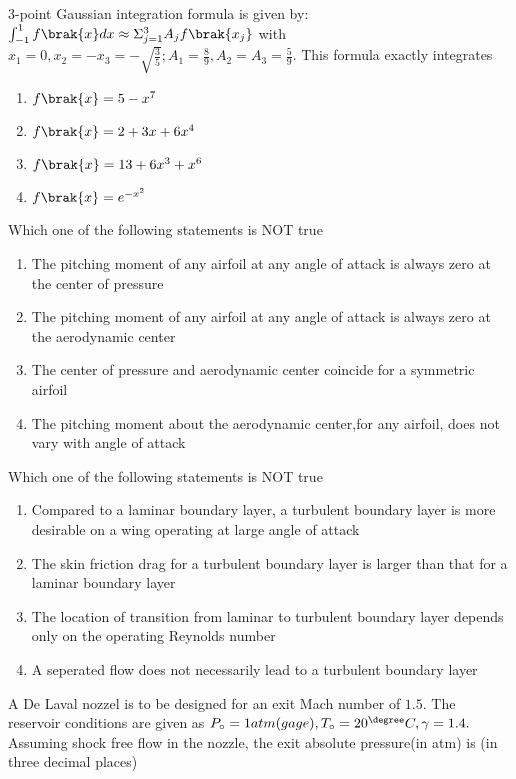 \item $3$-point Gaussian integration formula is given by:
	$\int_{-1}^{1}f\brak{x}dx \approx \Sigma_{j=1}^{3} A_jf\brak{x_j}$ with $x_1=0,x_2=-x_3=-\sqrt{\frac{3}{5}};A_1=\frac{8}{9},A_2=A_3=\frac{5}{9}.$
		This formula exactly integrates
		\begin{enumerate}
			\item $f\brak{x}=5-x^7$
			\item $f\brak{x}=2+3x+6x^4$
			\item $f\brak{x}=13+6x^3+x^6$
			\item $f\brak{x}=e^{-x^2}$
		\end{enumerate}

\item Which one of the following statements is NOT true
	\begin{enumerate}
        \item The pitching moment of any airfoil at any angle of attack is always zero at the center of pressure
        \item The pitching moment of any airfoil at any angle of attack is always zero at the aerodynamic center
        \item The center of pressure and aerodynamic center coincide for a symmetric airfoil
        \item The pitching moment about the aerodynamic center,for any airfoil, does not vary with angle of attack
	\end{enumerate}

\item Which one of the following statements is NOT true
	\begin{enumerate}
		\item Compared to a laminar boundary layer, a turbulent boundary layer is more desirable on a wing operating at large angle of attack
		\item The skin friction drag for a turbulent boundary layer is larger than that for a laminar boundary layer
		\item The location of transition from laminar to turbulent boundary layer depends only on the operating Reynolds number
		\item A seperated flow does not necessarily lead to a turbulent boundary layer
	\end{enumerate}
\item A De Laval nozzel is to be designed for an exit Mach number of $1.5$. The reservoir conditions are given as $P_{\circ}=1 atm(gage),T_{\circ}=20^{\degree}C,\gamma=1.4.$ Assuming shock free flow in the nozzle, the exit absolute pressure(in atm) is \underline{\hspace{2cm}} (in three decimal places)

